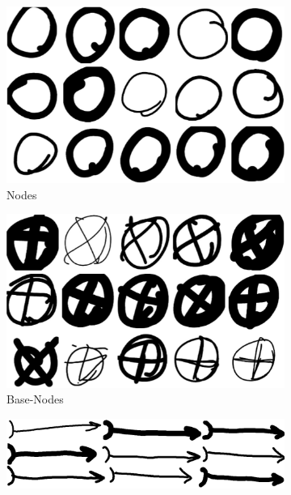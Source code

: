\begin{figure}
  \centering
    \begin{subfigure}[b]{0.4\textwidth}
        \includegraphics[width=\textwidth]{images/os.png}
        \caption{Nodes}
        \label{fig:os}
    \end{subfigure}
    \begin{subfigure}[b]{0.4\textwidth}
        \includegraphics[width=\textwidth]{images/xs.png}
        \caption{Base-Nodes}
        \label{fig:xs}
    \end{subfigure}
    \begin{subfigure}[b]{0.4\textwidth}
      \includegraphics[width=\textwidth]{images/rs.png}

\end{subfigure}
\end{figure}
